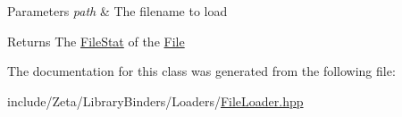\begin{DoxyParams}{Parameters}
{\em path} & The filename to load \\
\hline
\end{DoxyParams}
\begin{DoxyReturn}{Returns}
The \hyperlink{structZeta_1_1FileLoader_1_1FileStat}{File\+Stat} of the \hyperlink{classZeta_1_1File}{File} 
\end{DoxyReturn}


The documentation for this class was generated from the following file\+:\begin{DoxyCompactItemize}
\item 
include/\+Zeta/\+Library\+Binders/\+Loaders/\hyperlink{FileLoader_8hpp}{File\+Loader.\+hpp}\end{DoxyCompactItemize}
